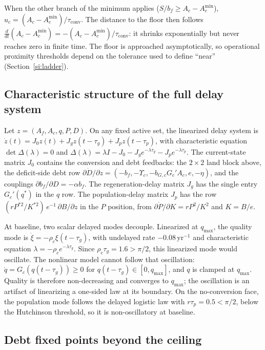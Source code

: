 \documentclass[11pt,a4paper]{article}
\newcommand{\Ups}{\Upsilon_c}
\newcommand{\Acmin}{A_c^{\min}}
\newcommand{\tconv}{\tau_{\mathrm{conv}}}
\begin{document}
When the other branch of the minimum applies ($S/b_f\ge A_c-\Acmin$), $u_c=(A_c-\Acmin)/\tconv$. The distance to the floor then follows $\frac{d}{dt}(A_c-\Acmin)=-(A_c-\Acmin)/\tconv$: it shrinks exponentially but never reaches zero in finite time. The floor is approached asymptotically, so operational proximity thresholds depend on the tolerance used to define “near” (Section~\ref{si:ladder}).

\subsection{Characteristic structure of the full delay system}\label{si:char}

Let $z=(A_f,A_c,q,P,D)$. On any fixed active set, the linearized delay system is $\dot z(t)=J_0z(t)+J_gz(t-\tau_g)+J_pz(t-\tau_p)$, with characteristic equation $\det\Delta(\lambda)=0$ and $\Delta(\lambda)=\lambda I-J_0-J_ge^{-\lambda\tau_g}-J_pe^{-\lambda\tau_p}$. The current-state matrix $J_0$ contains the conversion and debt feedbacks: the $2\times2$ land block above, the deficit-side debt row $\partial\dot D/\partial z=(-b_f,-\Ups,-b_{G,c}G_c'A_c,e,-\eta)$, and the couplings $\partial b_f/\partial D=-\alpha b_f$. The regeneration-delay matrix $J_g$ has the single entry $G_c'(q^*)$ in the $q$ row. The population-delay matrix $J_p$ has the row $(rP^{*2}/K^{*2})\,e^{-1}\,\partial B/\partial z$ in the $P$ position, from $\partial\dot P/\partial K=rP^2/K^2$ and $K=B/e$.

At baseline, two scalar delayed modes decouple. Linearized at $q_{\max}$, the quality mode is $\dot\xi=-\rho_c\xi(t-\tau_g)$, with undelayed rate $-0.08\,\mathrm{yr}^{-1}$ and characteristic equation $\lambda=-\rho_ce^{-\lambda\tau_g}$. Since $\rho_c\tau_g=1.6>\pi/2$, this linearized mode would oscillate. The nonlinear model cannot follow that oscillation: $\dot q=G_c(q(t-\tau_g))\ge0$ for $q(t-\tau_g)\in[0,q_{\max}]$, and $q$ is clamped at $q_{\max}$. Quality is therefore non-decreasing and converges to $q_{\max}$; the oscillation is an artifact of linearizing a one-sided law at its boundary. On the no-conversion face, the population mode follows the delayed logistic law with $r\tau_p=0.5<\pi/2$, below the Hutchinson threshold, so it is non-oscillatory at baseline.

\subsection{Debt fixed points beyond the ceiling}\label{si:debt}
\end{document}
